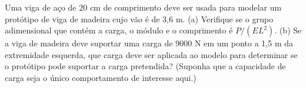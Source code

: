 Uma viga de aço de 20 cm de comprimento deve ser usada para modelar um protótipo de viga de madeira cujo vão é de 3,6 m. (a) Verifique se o grupo adimensional que contém a carga, o módulo e o comprimento é $P/(EL^2)$. (b) Se a viga de madeira deve suportar uma carga de 9000 N em um ponto a 1,5 m da extremidade esquerda, que carga deve ser aplicada ao modelo para determinar se o protótipo pode suportar a carga pretendida? (Suponha que a capacidade de carga seja o único comportamento de interesse aqui.)

